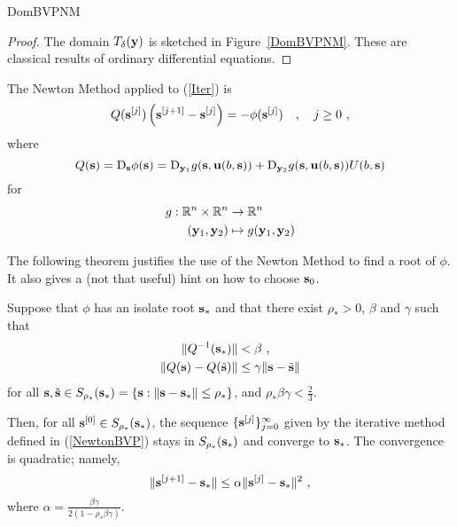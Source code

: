 {DomBVPNM}

\begin{proof}
The domain $T_\delta(\mathbf{y})$ is sketched in Figure~\ref{DomBVPNM}.
These are classical results of ordinary differential equations.
\end{proof}

The Newton Method applied to (\ref{Iter}) is
\begin{equation} \label{NewtonBVP}
  Q(\mathbf{s}^{[j]}) \left( \mathbf{s}^{[j+1]} - \mathbf{s}^{[j]} \right)
  = -\phi(\mathbf{s}^{[j]}) \quad , \quad j \geq 0 \ ,
\end{equation}
where
\[
Q(\mathbf{s}) = \mathrm{D}_{\mathbf{s}} \phi(\mathbf{s})
= \mathrm{D}_{\mathbf{y}_1}g(\mathbf{s},\mathbf{u}(b,\mathbf{s}))
+ \mathrm{D}_{\mathbf{y}_2}g(\mathbf{s},\mathbf{u}(b,\mathbf{s})) U(b,\mathbf{s})
\]
for
\begin{align*}
g:\mathbb{R}^n \times \mathbb{R}^n &\to \mathbb{R}^n \\
(\mathbf{y}_1,\mathbf{y}_2) &\mapsto g(\mathbf{y}_1,\mathbf{y}_2)
\end{align*}

The following theorem justifies the use of the Newton Method to find a
root of $\phi$.  It also gives a (not that useful) hint
on how to choose $\mathbf{s}_0$.

\begin{theorem}
Suppose that $\phi$ has an isolate root $\mathbf{s}_\ast$
and that there exist $\rho_\ast>0$, $\beta$ and $\gamma$ such that
\begin{align*}
\| Q^{-1}(\mathbf{s}_\ast) \| &< \beta \ , \\
\| Q(\mathbf{s}) - Q(\tilde{\mathbf{s}}) \| &\leq \gamma
\| \mathbf{s} - \tilde{\mathbf{s}}\|
\end{align*}
for all $\mathbf{s}, \tilde{\mathbf{s}} \in S_{\rho_\ast}(\mathbf{s}_\ast) =
\{ \mathbf{s} : \| \mathbf{s} - \mathbf{s}_\ast \| \leq \rho_\ast \}$,
and $\displaystyle \rho_\ast \beta \gamma < \frac{2}{3}$.

Then, for all $\mathbf{s}^{[0]} \in S_{\rho_\ast}(\mathbf{s}_\ast)$, the
sequence $\{\mathbf{s}^{[j]}\}_{j=0}^\infty$ given by the iterative method
defined in (\ref{NewtonBVP}) stays in $S_{\rho_\ast}(\mathbf{s}_\ast)$
and converge to $\mathbf{s}_\ast$.  The convergence is quadratic; namely,
\begin{equation} \label{contract}
\| \mathbf{s}^{[j+1]} - \mathbf{s}_\ast \| \leq \alpha \|
\mathbf{s}^{[j]} - \mathbf{s}_\ast \|^2 \ ,
\end{equation}
where $\displaystyle \alpha = \frac{\beta\gamma}{2(1-\rho_\ast \beta\gamma)}$.
\label{CforNewton}
\end{theorem}

